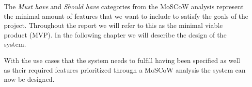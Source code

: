 The \textit{Must have} and \textit{Should have} categories from the MoSCoW analysis represent the minimal amount of features that we want to include to satisfy the goals of the project. Throughout the report we will refer to this as the minimal viable product (MVP).
In the following chapter we will describe the design of the system.



With the use cases that the system needs to fulfill having been specified as well as their required features prioritized through a MoSCoW analysis the system can now be designed. 
    

